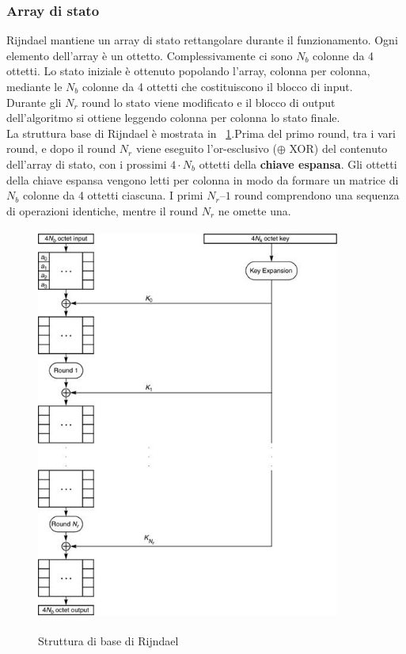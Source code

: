 \subsubsection{Array di stato}
Rijndael mantiene un array di stato rettangolare durante il funzionamento. Ogni elemento dell'array è un ottetto. Complessivamente ci sono $N_{b}$ colonne da 4 ottetti. Lo stato iniziale è ottenuto popolando l’array, colonna per colonna, mediante le $N_{b}$ colonne da 4 ottetti che costituiscono il blocco di input. \\

Durante gli $N_{r}$ round lo stato viene modificato e il blocco di output dell'algoritmo si ottiene leggendo colonna per colonna lo stato finale. \\

La struttura base di Rijndael è mostrata in \figurename ~\ref{fig:Rij_struct}.Prima del primo round, tra i vari round, e dopo il round $N_{r}$ viene eseguito l'or-esclusivo ($\oplus$ XOR) del contenuto dell'array di stato, con i prossimi $4\cdot N_{b}$ ottetti della \textbf{chiave espansa}. Gli ottetti della chiave espansa vengono letti per colonna in modo da formare un matrice di $N_{b}$ colonne da 4 ottetti ciascuna. I primi $N_{r} – 1$ round comprendono una sequenza di operazioni identiche, mentre il round $N_{r}$ ne omette una.

\begin{figure}[htbp]
	\centering%
	\subfigure%
	{\includegraphics[height=13cm, width=10cm, keepaspectratio]{Immagini/chiave_segreta/rijndael_struttura.png}}
	\caption{Struttura di base di Rijndael \label{fig:Rij_struct}} 	
\end{figure}

